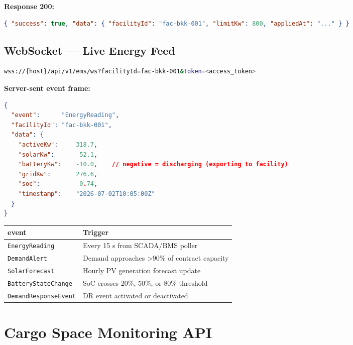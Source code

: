 \documentclass{article}
\begin{document}
\textbf{Response 200:}
\begin{lstlisting}[language=json]
{ "success": true, "data": { "facilityId": "fac-bkk-001", "limitKw": 800, "appliedAt": "..." } }
\end{lstlisting}

\subsection{WebSocket --- Live Energy Feed}

\begin{lstlisting}[language=bash]
wss://{host}/api/v1/ems/ws?facilityId=fac-bkk-001&token=<access_token>
\end{lstlisting}

\textbf{Server-sent event frame:}
\begin{lstlisting}[language=json, caption=EMS live push event]
{
  "event":      "EnergyReading",
  "facilityId": "fac-bkk-001",
  "data": {
    "activeKw":     318.7,
    "solarKw":       52.1,
    "batteryKw":    -10.0,    // negative = discharging (exporting to facility)
    "gridKw":       276.6,
    "soc":           0.74,
    "timestamp":    "2026-07-02T10:05:00Z"
  }
}
\end{lstlisting}

\begin{center}
\begin{tabular}{ll}
\toprule
\textbf{event} & \textbf{Trigger}\\
\midrule
\texttt{EnergyReading}     & Every 15 s from SCADA/BMS poller\\
\texttt{DemandAlert}       & Demand approaches \textgreater 90\% of contract capacity\\
\texttt{SolarForecast}     & Hourly PV generation forecast update\\
\texttt{BatteryStateChange}& SoC crosses 20\%, 50\%, or 80\% threshold\\
\texttt{DemandResponseEvent}& DR event activated or deactivated\\
\bottomrule
\end{tabular}
\end{center}

\newpage

\section{Cargo Space Monitoring API}
\end{document}
